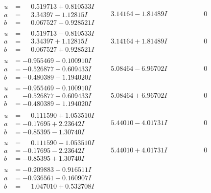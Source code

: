 \documentclass[1p]{elsarticle_modified}
\theoremstyle{definition}
\begin{document}
$$\begin{array}{c|c|c}
\begin{aligned}
u &= \phantom{-}0.519713 + 0.810533 I \\
a &= \phantom{-}3.34397 - 1.12815 I \\
b &= \phantom{-}0.067527 - 0.928521 I\end{aligned}
 & \phantom{-}3.14164 - 1.81489 I & \phantom{-0.000000 } 0 \\ \hline\begin{aligned}
u &= \phantom{-}0.519713 - 0.810533 I \\
a &= \phantom{-}3.34397 + 1.12815 I \\
b &= \phantom{-}0.067527 + 0.928521 I\end{aligned}
 & \phantom{-}3.14164 + 1.81489 I & \phantom{-0.000000 } 0 \\ \hline\begin{aligned}
u &= -0.955469 + 0.100910 I \\
a &= -0.526877 + 0.609433 I \\
b &= -0.480389 - 1.194020 I\end{aligned}
 & \phantom{-}5.08464 - 6.96702 I & \phantom{-0.000000 } 0 \\ \hline\begin{aligned}
u &= -0.955469 - 0.100910 I \\
a &= -0.526877 - 0.609433 I \\
b &= -0.480389 + 1.194020 I\end{aligned}
 & \phantom{-}5.08464 + 6.96702 I & \phantom{-0.000000 } 0 \\ \hline\begin{aligned}
u &= \phantom{-}0.111590 + 1.053510 I \\
a &= -0.17695 + 2.23642 I \\
b &= -0.85395 - 1.30740 I\end{aligned}
 & \phantom{-}5.44010 - 4.01731 I & \phantom{-0.000000 } 0 \\ \hline\begin{aligned}
u &= \phantom{-}0.111590 - 1.053510 I \\
a &= -0.17695 - 2.23642 I \\
b &= -0.85395 + 1.30740 I\end{aligned}
 & \phantom{-}5.44010 + 4.01731 I & \phantom{-0.000000 } 0 \\ \hline\begin{aligned}
u &= -0.209883 + 0.916511 I \\
a &= -0.936561 + 0.160907 I \\
b &= \phantom{-}1.047010 + 0.532708 I\end{aligned}

\end{array}$$
\end{document}
